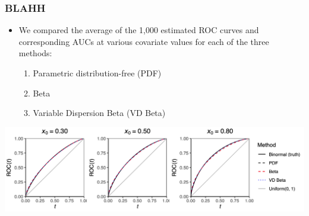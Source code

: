 \documentclass[t]{beamer}
\begin{document}
\begin{frame}
	\frametitle{BLAHH}
	\begin{itemize}
		\item We compared the  average of the 1,000 estimated ROC curves and corresponding AUCs at various covariate values for each of the three methods:
		\begin{enumerate}
			\item Parametric distribution-free (PDF)
			\item Beta
			\item Variable Dispersion Beta (VD Beta)
		\end{enumerate}
	\vspace{-.075in}
	\end{itemize}
	  \begin{center}
		\includegraphics[scale=0.3]{sim_results}
	\end{center}
\vspace{-.1in}
		\begin{table}[ht]
	\centering
	\begin{threeparttable}
	\end{threeparttable}
		\end{table}
\end{frame}
\end{document}
